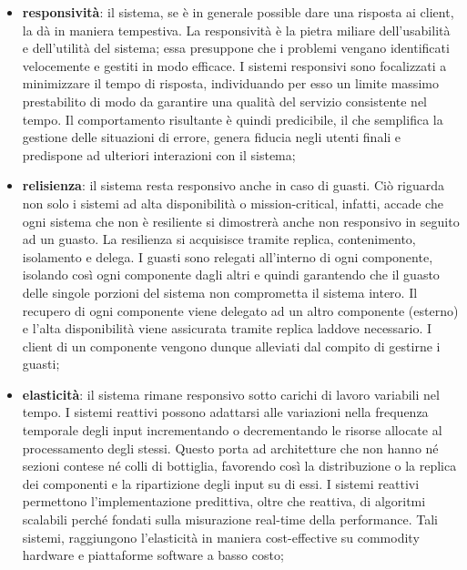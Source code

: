 \documentclass[12pt,a4paper,openright,twoside]{book}
\begin{document}
\begin{itemize}
    \item \textbf{responsività}: il sistema, se è in generale possible dare una risposta ai client, la dà in maniera tempestiva. La responsività è la pietra miliare dell'usabilità e dell'utilità del sistema; essa presuppone che i problemi vengano identificati velocemente e gestiti in modo efficace. I sistemi responsivi sono focalizzati a minimizzare il tempo di risposta, individuando per esso un limite massimo prestabilito di modo da garantire una qualità del servizio consistente nel tempo. Il comportamento risultante è quindi predicibile, il che semplifica la gestione delle situazioni di errore, genera fiducia negli utenti finali e predispone ad ulteriori interazioni con il sistema;
    \item \textbf{relisienza}: il sistema resta responsivo anche in caso di guasti. Ciò riguarda non solo i sistemi ad alta disponibilità o mission-critical, infatti, accade che ogni sistema che non è resiliente si dimostrerà anche non responsivo in seguito ad un guasto. La resilienza si acquisisce tramite replica, contenimento, isolamento e delega. I guasti sono relegati all'interno di ogni componente, isolando così ogni componente dagli altri e quindi garantendo che il guasto delle singole porzioni del sistema non comprometta il sistema intero. Il recupero di ogni componente viene delegato ad un altro componente (esterno) e l'alta disponibilità viene assicurata tramite replica laddove necessario. I client di un componente vengono dunque alleviati dal compito di gestirne i guasti;
    \item \textbf{elasticità}: il sistema rimane responsivo sotto carichi di lavoro variabili nel tempo. I sistemi reattivi possono adattarsi alle variazioni nella frequenza temporale degli input incrementando o decrementando le risorse allocate al processamento degli stessi. Questo porta ad architetture che non hanno né sezioni contese né colli di bottiglia, favorendo così la distribuzione o la replica dei componenti e la ripartizione degli input su di essi. I sistemi reattivi permettono l'implementazione predittiva, oltre che reattiva, di algoritmi scalabili perché fondati sulla misurazione real-time della performance. Tali sistemi, raggiungono l'elasticità in maniera cost-effective su commodity hardware e piattaforme software a basso costo;

\end{itemize}
\end{document}
